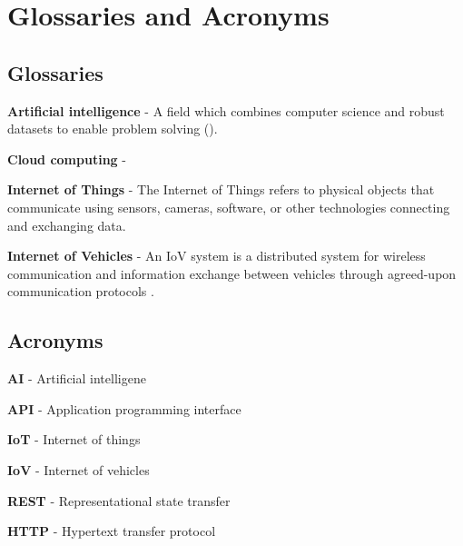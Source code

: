 \chapter{Glossaries and Acronyms}
\section{Glossaries}
\textbf{Artificial intelligence} - A field which combines computer science and robust datasets to enable problem solving (\cite{artificial_intelligence}).

\textbf{Cloud computing} - 

\textbf{Internet of Things} - The Internet of Things refers to physical objects that communicate using sensors, cameras, software, or other technologies connecting and exchanging data. 

\textbf{Internet of Vehicles} - An IoV system is a distributed system for wireless communication and information exchange between vehicles through agreed-upon communication protocols \parencite{chinese_iov}.

\section{Acronyms}
\textbf{AI} - Artificial intelligene

\textbf{API} - Application programming interface

\textbf{IoT} - Internet of things

\textbf{IoV} - Internet of vehicles

\textbf{REST} - Representational state transfer

\textbf{HTTP} - Hypertext transfer protocol
